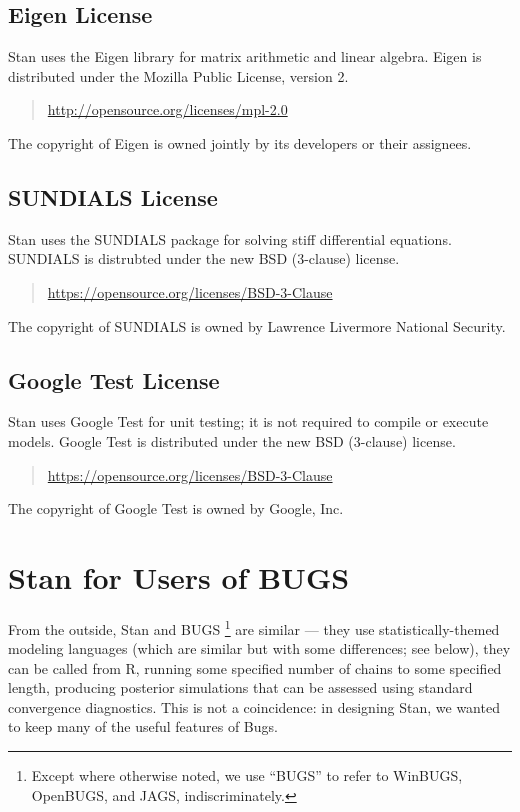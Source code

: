 \section{Eigen License}

Stan uses the Eigen library for matrix arithmetic and linear algebra.
Eigen is distributed under the Mozilla Public License, version 2.
%
\begin{quote}
\url{http://opensource.org/licenses/mpl-2.0}
\end{quote}
%
The copyright of Eigen is owned jointly by its developers or their
assignees.

\section{SUNDIALS License}

Stan uses the SUNDIALS package for solving stiff differential
equations.  SUNDIALS is distrubted under the new BSD (3-clause) license.
%
\begin{quote}
\url{https://opensource.org/licenses/BSD-3-Clause}
\end{quote}
%
The copyright of SUNDIALS is owned by Lawrence Livermore National
Security.

\section{Google Test License}

Stan uses Google Test for unit testing; it is not required to compile
or execute models.  Google Test is distributed under the new BSD (3-clause)
license.
%
\begin{quote}
\url{https://opensource.org/licenses/BSD-3-Clause}
\end{quote}
%
The copyright of Google Test is owned by Google, Inc.


\chapter{Stan for Users of BUGS}\label{stan-for-bugs.appendix}

From the outside, Stan and BUGS%
%
\footnote{Except where otherwise noted, we use ``BUGS'' to refer to
  WinBUGS, OpenBUGS, and JAGS, indiscriminately.}
%
are similar --- they use statistically-themed modeling languages
(which are similar but with some differences; see below), they can be
called from R, running some specified number of chains to some
specified length, producing posterior simulations that can be assessed
using standard convergence diagnostics.  This is not a coincidence:
in designing Stan, we wanted to keep many of the useful features of
Bugs.


